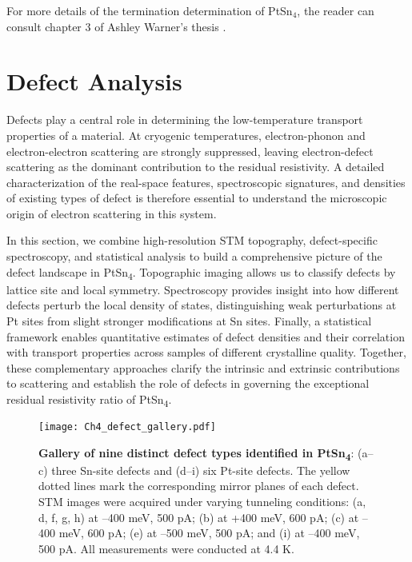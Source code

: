 \par For more details of the termination determination of PtSn$_4$, the reader can consult chapter 3 of Ashley Warner's thesis \cite{warnerDefectTerraceCharacterization2022}.



\section{Defect Analysis}
Defects play a central role in determining the low-temperature transport properties of a material. At cryogenic temperatures, electron-phonon and electron-electron scattering are strongly suppressed, leaving electron-defect scattering as the dominant contribution to the residual resistivity. A detailed characterization of the real-space features, spectroscopic signatures, and densities of existing types of defect is therefore essential to understand the microscopic origin of electron scattering in this system.

In this section, we combine high-resolution STM topography, defect-specific spectroscopy, and statistical analysis to build a comprehensive picture of the defect landscape in PtSn\textsubscript{4}. Topographic imaging allows us to classify defects by lattice site and local symmetry. Spectroscopy provides insight into how different defects perturb the local density of states, distinguishing weak perturbations at Pt sites from slight stronger modifications at Sn sites. Finally, a statistical framework enables quantitative estimates of defect densities and their correlation with transport properties across samples of different crystalline quality. Together, these complementary approaches clarify the intrinsic and extrinsic contributions to scattering and establish the role of defects in governing the exceptional residual resistivity ratio of PtSn\textsubscript{4}.

\begin{figure}
	\centering
	\texttt{[image: Ch4\_defect\_gallery.pdf]}
	\caption[\textbf{Gallery of nine distinct defect types identified in PtSn\textsubscript{4}}]{\textbf{Gallery of nine distinct defect types identified in PtSn\textsubscript{4}}: (a–c) three Sn-site defects and (d–i) six Pt-site defects. The yellow dotted lines mark the corresponding mirror planes of each defect. STM images were acquired under varying tunneling conditions: (a, d, f, g, h) at –400 meV, 500 pA; (b) at +400 meV, 600 pA; (c) at –400 meV, 600 pA; (e) at –500 meV, 500 pA; and (i) at –400 meV, 500 pA. All measurements were conducted at 4.4 K.}
	\label{fig:ch4_defectgallery}
\end{figure}

